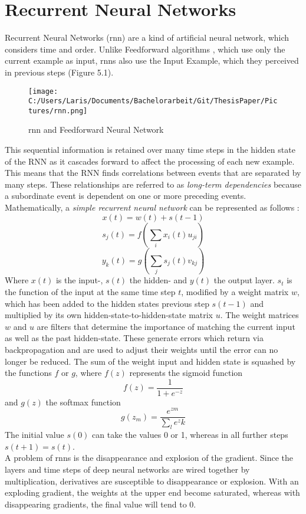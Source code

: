 \documentclass[a4paper, 11pt,titlepage,oneside,openany]{book}
\begin{document}
\section{Recurrent Neural Networks}
Recurrent Neural Networks (\gls{rnn}) are a kind of artificial neural network, which considers time and order. Unlike Feedforward algorithms \cite{feedforward}, which use only the current example as input, \gls{rnn}s also use the Input Example, which they perceived in previous steps (Figure 5.1). 
\begin{figure}
	\centering
	\texttt{[image: C:/Users/Laris/Documents/Bachelorarbeit/Git/ThesisPaper/Pictures/rnn.png]}
	\caption{\gls{rnn} and Feedforward Neural Network \cite{rnn}}
\end{figure}
This sequential information is retained over many time steps in the hidden state of the RNN as it cascades forward to affect the processing of each new example. This means that the RNN finds correlations between events that are separated by many steps. These relationships are referred to as \textit{long-term dependencies} because a subordinate event is dependent on one or more preceding events.\\
\newpage
\noindent Mathematically, a \textit{simple recurrent neural network} \cite{ELMAN1990179} can be represented as follows \cite{rnnmodel}:
\[
x(t)=w(t)+s(t-1)
\]
\[
s_j(t)=f(\sum_{i}x_i(t)u_{ji})
\]
\[
y_k(t)=g(\sum_{j}s_j(t)v_{kj})
\]
Where $x(t)$ is the input-, $s(t)$ the hidden- and $y(t)$ the output layer. $s_t$ is the function of the input at the same time step $t$, modified by a weight matrix $w$, which has been added to the hidden states previous step $s(t-1)$ and multiplied by its own hidden-state-to-hidden-state matrix $u$. The weight matrices $w$ and $u$ are filters that determine the importance of matching the current input as well as the past hidden-state. These generate errors which return via backpropagation and are used to adjust their weights until the error can no longer be reduced. The sum of the weight input and hidden state is squashed by the functions $f$ or $g$, where  $f(z)$ represents the sigmoid function
\[
f(z)=\frac{1}{1+e^{-z}}
\]
and $g(z)$ the softmax function
\[
g(z_m)=\frac{e^{zm}}{\sum_{l}e^zk}
\]
The initial value $s(0)$ can take the values 0 or 1, whereas in all further steps $s(t+1)=s(t)$. \\
\noindent A problem of \gls{rnn}s is the disappearance and explosion of the gradient. Since the layers and time steps of deep neural networks are wired together by multiplication, derivatives are susceptible to disappearance or explosion. With an exploding gradient, the weights at the upper end become saturated, whereas with disappearing gradients, the final value will tend to 0.
\end{document}
